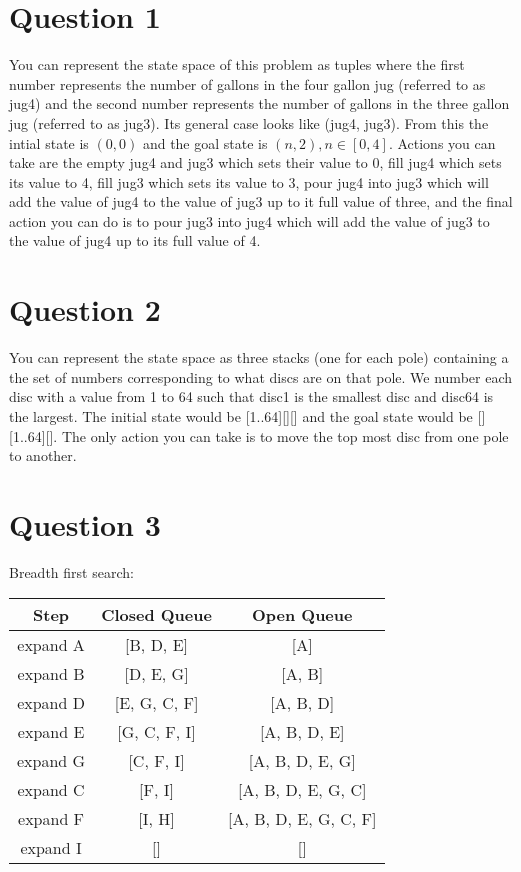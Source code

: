\documentclass[12pt]{article}
\begin{document}
\section*{Question 1} %
\label{sec:question_1}
You can represent the state space of this problem as tuples where the first number represents the number of gallons in the four gallon jug (referred to as jug4) and the second number represents the number of gallons in the three gallon jug (referred to as jug3). Its general case looks like (jug4, jug3). From this the intial state is $(0,0)$ and the goal state is $(n, 2), n\in [0,4]$. Actions you can take are the empty jug4 and jug3 which sets their value to 0, fill jug4 which sets its value to 4, fill jug3 which sets its value to 3, pour jug4 into jug3 which will add the value of jug4 to the value of jug3 up to it full value of three, and the final action you can do is to pour jug3 into jug4 which will add the value of jug3 to the value of jug4 up to its full value of 4.


\section*{Question 2} %
\label{sec:question_2}
You can represent the state space as three stacks (one for each pole) containing a the set of numbers corresponding to what discs are on that pole. We number each disc with a value from 1 to 64 such that disc1 is the smallest disc and disc64 is the largest. The initial state would be [1..64][][] and the goal state would be [][1..64][]. The only action you can take is to move the top most disc from one pole to another.



\section*{Question 3} %
\label{sec:question_3}
Breadth first search:
\begin{center}
  \begin{tabular}{|c|c|c|}
    \hline
    \textbf{Step} & \textbf{Closed Queue} & \textbf{Open Queue} \\ \hline
    expand A & [B, D, E] & [A] \\ \hline
    expand B & [D, E, G] & [A, B] \\ \hline
    expand D & [E, G, C, F] & [A, B, D] \\ \hline
    expand E & [G, C, F, I] & [A, B, D, E] \\ \hline
    expand G & [C, F, I] & [A, B, D, E, G] \\ \hline
    expand C & [F, I] & [A, B, D, E, G, C] \\ \hline
    expand F & [I, H] & [A, B, D, E, G, C, F] \\ \hline
    expand I & [] & [] \\ \hline    
  \end{tabular}
\end{center}
\end{document}
